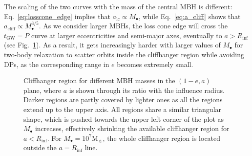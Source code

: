 \documentclass[desactivate]{aa}
\begin{document}
        The scaling of the two curves with the mass of the central MBH is different: Eq.\ \eqref{eq:losscone_edge} implies that $a_\mathrm{lc} \propto M_\bullet$, while Eq.\ \eqref{eq:a_cliff} shows that $a_\mathrm{cliff} \propto M_\bullet^{3/5}$. As we consider larger MBHs, the loss cone edge will cross the $t_\mathrm{GW} = P$ curve at larger eccentricities and semi-major axes, eventually to $a>R_\mathrm{inf}$ (see Fig.\ \ref{fig:cliff_masses}). As a result, it gets increasingly harder with larger values of $M_\bullet$ for two-body relaxation to scatter orbits inside the cliffhanger region while avoiding DPs, as the corresponding range in $e$ becomes extremely small.
        \begin{figure}
            \centering
            \caption{Cliffhanger region for different MBH masses in the $(1-e, a)$ plane, where $a$ is shown through its ratio with the influence radius. Darker regions are partly covered by lighter ones as all the regions extend up to the upper axis. All regions share a similar triangular shape, which is pushed towards the upper left corner of the plot as $M_\bullet$ increases, effectively shrinking the available cliffhanger region for $a < R_\mathrm{inf}$. For $M_\bullet = 10^7 \mathrm{M}_\sun$, the whole cliffhanger region is located outside the $a=R_\mathrm{inf}$ line.}
            \label{fig:cliff_masses}
        \end{figure}
\end{document}
